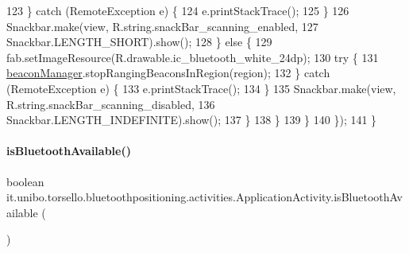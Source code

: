 \begin{DoxyCode}
123                         \} \textcolor{keywordflow}{catch} (RemoteException e) \{
124                             e.printStackTrace();
125                         \}
126                         Snackbar.make(view, R.string.snackBar\_scanning\_enabled,
127                                 Snackbar.LENGTH\_SHORT).show();
128                     \} \textcolor{keywordflow}{else} \{
129                         fab.setImageResource(R.drawable.ic\_bluetooth\_white\_24dp);
130                         \textcolor{keywordflow}{try} \{
131                             \hyperlink{classit_1_1unibo_1_1torsello_1_1bluetoothpositioning_1_1activities_1_1ApplicationActivity_a973c37226a3dbba6016966c3555aff65_a973c37226a3dbba6016966c3555aff65}{beaconManager}.stopRangingBeaconsInRegion(region);
132                         \} \textcolor{keywordflow}{catch} (RemoteException e) \{
133                             e.printStackTrace();
134                         \}
135                         Snackbar.make(view, R.string.snackBar\_scanning\_disabled,
136                                 Snackbar.LENGTH\_INDEFINITE).show();
137                     \}
138                 \}
139             \}
140         \});
141     \}
\end{DoxyCode}
\hypertarget{classit_1_1unibo_1_1torsello_1_1bluetoothpositioning_1_1activities_1_1ApplicationActivity_abffd55741be864ad5b151c8f8c6d70ff_abffd55741be864ad5b151c8f8c6d70ff}{}\label{classit_1_1unibo_1_1torsello_1_1bluetoothpositioning_1_1activities_1_1ApplicationActivity_abffd55741be864ad5b151c8f8c6d70ff_abffd55741be864ad5b151c8f8c6d70ff} 
\paragraph{\texorpdfstring{is\+Bluetooth\+Available()}{isBluetoothAvailable()}}
{\footnotesize\ttfamily boolean it.\+unibo.\+torsello.\+bluetoothpositioning.\+activities.\+Application\+Activity.\+is\+Bluetooth\+Available (\begin{DoxyParamCaption}{ }\end{DoxyParamCaption})\hspace{0.3cm}{\ttfamily [private]}}


